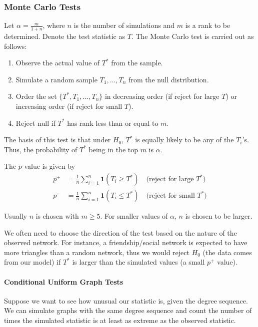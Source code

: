 \documentclass{article}
\begin{document}
\subsubsection{Monte Carlo Tests} 
Let $\alpha = \frac{m}{1+n}$, where $n$ is the number of simulations and $m$ is a rank to be determined. Denote the test statistic as $T$. The Monte Carlo test is carried out as follows:
\begin{enumerate}
    \item Observe the actual value of $T^*$ from the sample.
    \item Simulate a random sample $T_1, \ldots, T_n$ from the null distribution.
    \item Order the set $\{T^*, T_1, \ldots, T_n\}$ in decreasing order (if reject for large $T$) or increasing order (if reject for small $T$).
    \item Reject null if $T^*$ has rank less than or equal to $m$.
\end{enumerate}

The basis of this test is that under $H_0$, $T^*$ is equally likely to be any of the $T_i$'s. Thus, the probability of $T^*$ being in the top $m$ is $\alpha$. 

The $p$-value is given by 
\begin{align*}
    p^+ &= \frac{1}{n}\sum_{i=1}^{n}\mathbf{1}(T_i\geq T^*) \quad \text{(reject for large $T^*$)}\\
    p^- &= \frac{1}{n}\sum_{i=1}^{n}\mathbf{1}(T_i\leq T^*) \quad \text{(reject for small $T^*$)}
\end{align*}


\begin{remark}
    Usually $n$ is chosen with $m\geq 5$. For smaller values of $\alpha$, $n$ is chosen to be larger.  
\end{remark}

\begin{remark}
    We often need to choose the direction of the test based on the nature of the observed network. For instance, a friendship/social network is expected to have more triangles than a random network, thus we would reject $H_0$ (the data comes from our model) if $T^*$ is larger than the simulated values (a small $p^+$ value).
\end{remark}

\paragraph{Conditional Uniform Graph Tests} Suppose we want to see how unusual our statistic is, given the degree sequence. We can simulate graphs with the same degree sequence and count the number of times the simulated statistic is at least as extreme as the observed statistic.
\end{document}
